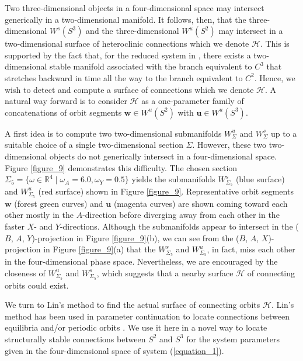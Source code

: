 \documentclass{ws-ijbc}
\begin{document}
Two three-dimensional objects in a four-dimensional space may intersect generically in a two-dimensional manifold.  It follows, then, that the three-dimensional $W^s(S^3)$ and the three-dimensional $W^u(S^2)$ may intersect in a two-dimensional surface of heteroclinic connections which we denote $\mathscr{H}$.  This is supported by the fact that, for the reduced system in \cite{QSSA}, there exists a two-dimensional stable manifold associated with the branch equivalent to $C^3$ that stretches backward in time all the way to the branch equivalent to $C^2$.  Hence, we wish to detect and compute a surface of connections which we denote $\mathscr{H}$.  A natural way forward is to consider $\mathscr{H}$ as a one-parameter family of concatenations of orbit segments $\mathbf{w} \in W^u(S^2)$ with $\mathbf{u} \in W^u(S^3)$.

A first idea is to compute two two-dimensional submanifolds $W^u_\Sigma$ and $W^s_\Sigma$ up to a suitable choice of a single two-dimensional section $\Sigma$.  However, these two two-dimensional objects do not generically intersect in a four-dimensional space.  Figure \ref{figure_9} demonstrates this difficulty.  The chosen section $\Sigma_5=\{\omega \in \mathbb{R}^4 \;|\; \omega_A= 6.0, \omega_Y=0.5 \}$ yields the submanifolds $W^s_{\Sigma_5}$ (blue surface) and $W^u_{\Sigma_5}$ (red surface) shown in Figure \ref{figure_9}.  Representative orbit segments $\mathbf{w}$ (forest green curves) and $\mathbf{u}$ (magenta curves) are shown coming toward each other mostly in the $A$-direction before diverging away from each other in the faster $X$- and $Y$-directions.  Although the submanifolds appear to intersect in the ($B$, $A$, $Y$)-projection in Figure \ref{figure_9}(b), we can see from the ($B$, $A$, $X$)-projection in Figure \ref{figure_9}(a) that the $W^s_{\Sigma_5}$ and $W^u_{\Sigma_5}$, in fact, miss each other in the four-dimensional phase space.  Nevertheless, we are encouraged by the closeness of $W^u_{\Sigma_5}$ and $W^s_{\Sigma_5}$, which suggests that a nearby surface $\mathscr{H}$ of connecting orbits could exist.

We turn to Lin's method to find the actual surface of connecting orbits $\mathscr{H}$.  Lin's method has been used in parameter continuation to locate connections between equilibria and/or periodic orbits \cite{Lin_original, Lin_POs, Lin_POs2}.  We use it here in a novel way to locate structurally stable connections between $S^2$ and $S^3$ for the system parameters given in the four-dimensional space of system (\ref{equation_1}).
\end{document}
